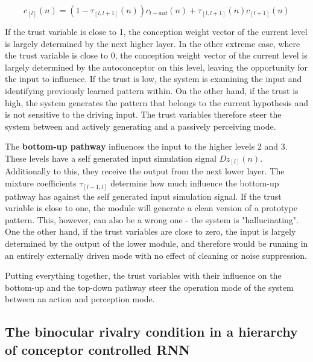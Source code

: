\documentclass[utf8]{frontiersSCNS} %
\begin{document}
    \begin{equation}
    c_{[l]}(n) = (1 - \tau_{[l,l+1]}(n)) c_{l-aut}
    (n) + \tau_{[l,l+1]}(n) c_{[l+1]}(n)
    \end{equation}
    
    If the trust variable is close to 1, the conception weight vector of the current level is largely determined by the next higher layer. In the other extreme case, where the trust variable is close to 0, the conception weight vector of the current level is largely determined by the autoconceptor on this level, leaving the opportunity for the input to influence. If the trust is low, the system is examining the input and identifying previously learned pattern within. On the other hand, if the trust is high, the system generates the pattern that belongs to the current hypothesis and is not sensitive to the driving input. The trust variables therefore steer the system between and actively generating and a passively perceiving mode. \cite{Jaeger2014} 
    
The \textbf{bottom-up pathway} influences the input to the higher levels 2 and 3. These levels have a self generated input simulation signal $D z_{[l]}(n)$. Additionally to this, they receive the output from the next lower layer. The mixture coefficients $\tau_{[l-1,l]}$ determine how much influence the bottom-up pathway has against the self generated input simulation signal. If the trust variable is close to one, the module will generate a clean version of a prototype pattern. This, however, can also be a wrong one - the system is "hallucinating". One the other hand, if the trust variables are close to zero, the input is largely determined by the output of the lower module, and therefore would be running in an entirely externally driven mode with no effect of cleaning or noise suppression.   
    
 

	Putting everything together, the trust variables with their influence on the bottom-up and the top-down pathway steer the operation mode of the system between an action and perception mode. 
    
\subsection{The binocular rivalry condition in a hierarchy of conceptor controlled RNN}
    \label{sec:simulation}
\end{document}
